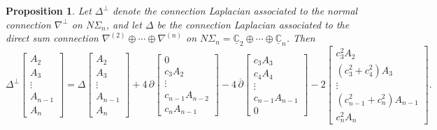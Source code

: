 \documentclass[10pt,a4paper]{amsart}
\newtheorem{prop}{Proposition}
\newcommand{\uC}{\underline{\mathbb{C}}}
\begin{document}
\begin{prop}\label{prop:normlap}
    Let $\Delta^\perp$ denote the connection Laplacian associated to the normal connection $\nabla^\perp$ on $N \Sigma_n$, and let $\Delta$ be the connection Laplacian associated to the direct sum connection $\nabla^{(2)} \oplus \cdots \oplus \nabla^{(n)}$ on $N\Sigma_n = \uC_2 \oplus \cdots \oplus \uC_n$.  Then
    \begin{equation*}
        \Delta^{\perp} \begin{bmatrix}
            A_2 \\
            A_3 \\
            \vdots \\
            A_{n-1} \\
            A_{n}
        \end{bmatrix} = \Delta \begin{bmatrix}
            A_2 \\
            A_3 \\
            \vdots \\
            A_{n-1} \\
            A_{n}
        \end{bmatrix} + 4 \, \partial \begin{bmatrix}
            0 \\
            c_3 A_2 \\
            \vdots \\
            c_{n-1} A_{n-2} \\
            c_{n} A_{n-1}
        \end{bmatrix} - 4 \, \overline{\partial} \begin{bmatrix}
            c_3 A_3 \\
            c_4 A_4 \\
            \vdots \\
            c_{n-1} A_{n-1} \\
            0
        \end{bmatrix} - 2 \begin{bmatrix}
            c_3^2 A_2 \\
            (c_3^2 + c_4^2) A_3 \\
            \vdots \\
            (c_{n-1}^2+c_n^2) A_{n-1} \\
            c_n^2 A_n
        \end{bmatrix}.
    \end{equation*}
\end{prop}
\end{document}
